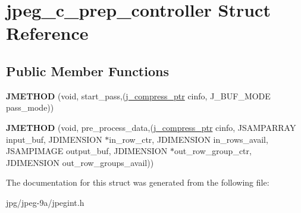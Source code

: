 \hypertarget{structjpeg__c__prep__controller}{\section{jpeg\+\_\+c\+\_\+prep\+\_\+controller Struct Reference}
\label{structjpeg__c__prep__controller}
}
\subsection*{Public Member Functions}
\begin{DoxyCompactItemize}
\item 
\hypertarget{structjpeg__c__prep__controller_af2fb43bbf035ffe6b1a28fb2382db63d}{{\bfseries J\+M\+E\+T\+H\+O\+D} (void, start\+\_\+pass,(\hyperlink{structjpeg__compress__struct}{j\+\_\+compress\+\_\+ptr} cinfo, J\+\_\+\+B\+U\+F\+\_\+\+M\+O\+D\+E pass\+\_\+mode))}\label{structjpeg__c__prep__controller_af2fb43bbf035ffe6b1a28fb2382db63d}

\item 
\hypertarget{structjpeg__c__prep__controller_a84100e06666ea90e6734dce2a10af554}{{\bfseries J\+M\+E\+T\+H\+O\+D} (void, pre\+\_\+process\+\_\+data,(\hyperlink{structjpeg__compress__struct}{j\+\_\+compress\+\_\+ptr} cinfo, J\+S\+A\+M\+P\+A\+R\+R\+A\+Y input\+\_\+buf, J\+D\+I\+M\+E\+N\+S\+I\+O\+N $\ast$in\+\_\+row\+\_\+ctr, J\+D\+I\+M\+E\+N\+S\+I\+O\+N in\+\_\+rows\+\_\+avail, J\+S\+A\+M\+P\+I\+M\+A\+G\+E output\+\_\+buf, J\+D\+I\+M\+E\+N\+S\+I\+O\+N $\ast$out\+\_\+row\+\_\+group\+\_\+ctr, J\+D\+I\+M\+E\+N\+S\+I\+O\+N out\+\_\+row\+\_\+groups\+\_\+avail))}\label{structjpeg__c__prep__controller_a84100e06666ea90e6734dce2a10af554}

\end{DoxyCompactItemize}


The documentation for this struct was generated from the following file\+:\begin{DoxyCompactItemize}
\item 
jpg/jpeg-\/9a/jpegint.\+h\end{DoxyCompactItemize}
